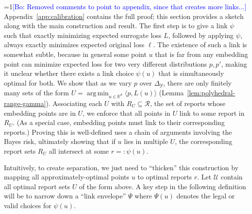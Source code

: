 \documentclass[12pt]{article}
\newcommand{\Comments}{1}
\newcommand{\mynote}[2]{\ifnum\Comments=1\textcolor{#1}{#2}\fi}
\newcommand{\bo}[1]{\mynote{blue}{[Bo: #1]}}
\newcommand{\reals}{\mathbb{R}}
\newcommand{\simplex}{\Delta_\Y}
\newcommand{\R}{\mathcal{R}}
\newcommand{\U}{\mathcal{U}}
\newcommand{\Y}{\mathcal{Y}}
\newcommand{\inprod}[2]{\langle #1, #2 \rangle}%
\newcommand{\toto}{\rightrightarrows}
\newcommand{\trim}{\mathrm{trim}}
\DeclareMathOperator*{\argmin}{arg\,min}
\newtheorem{proposition}{Proposition}
\begin{document}
\bo{Removed comments to point to appendix, since that creates more links...}
Appendix~\ref{app:calibration} contains the full proof; this section provides a sketch along with the main construction and result.
The first step is to give a link $\psi$ such that exactly minimizing expected surrogate loss $L$, followed by applying $\psi$, always exactly minimizes expected original loss $\ell$.
The existence of such a link is somewhat subtle, because in general some point $u$ that is far from any embedding point can minimize expected loss for two very different distributions $p,p'$, making it unclear whether there exists a link choice $\psi(u)$ that is simultaneously optimal for both.
We show that as we vary $p$ over $\simplex$, there are only finitely many sets of the form $U = \argmin_{u \in \reals^d} \inprod{p}{L(u)}$ (Lemma~\ref{lem:polyhedral-range-gamma}).
Associating each $U$ with $R_U \subseteq \R$, the set of reports whose embedding points are in $U$, we enforce that all points in $U$ link to some report in $R_U$.
(As a special case, embedding points must link to their corresponding reports.)
Proving this is well-defined uses a chain of arguments involving the Bayes risk, ultimately showing that if $u$ lies in multiple $U$, the corresponding report sets $R_U$ all intersect at some $r =: \psi(u)$.

%

Intuitively, to create separation, we just need to ``thicken'' this construction by mapping all approximately-optimal points $u$ to optimal reports $r$.
Let $\U$ contain all optimal report sets $U$ of the form above.
A key step in the following definition will be to narrow down a ``link envelope'' $\Psi$ where $\Psi(u)$ denotes the legal or valid choices for $\psi(u)$.
\end{document}

